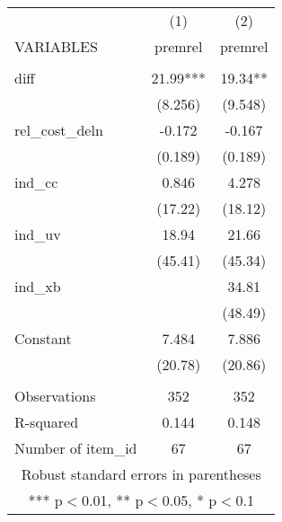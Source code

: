 \documentclass[]{article}
\begin{document}
\begin{tabular}{lcc} \hline
 & (1) & (2) \\
VARIABLES & premrel & premrel \\ \hline
 &  &  \\
diff & 21.99*** & 19.34** \\
 & (8.256) & (9.548) \\
rel\_cost\_deln & -0.172 & -0.167 \\
 & (0.189) & (0.189) \\
ind\_cc & 0.846 & 4.278 \\
 & (17.22) & (18.12) \\
ind\_uv & 18.94 & 21.66 \\
 & (45.41) & (45.34) \\
ind\_xb &  & 34.81 \\
 &  & (48.49) \\
Constant & 7.484 & 7.886 \\
 & (20.78) & (20.86) \\
 &  &  \\
Observations & 352 & 352 \\
R-squared & 0.144 & 0.148 \\
 Number of item\_id & 67 & 67 \\ \hline
\multicolumn{3}{c}{ Robust standard errors in parentheses} \\
\multicolumn{3}{c}{ *** p$<$0.01, ** p$<$0.05, * p$<$0.1} \\
\end{tabular}
\end{document}
